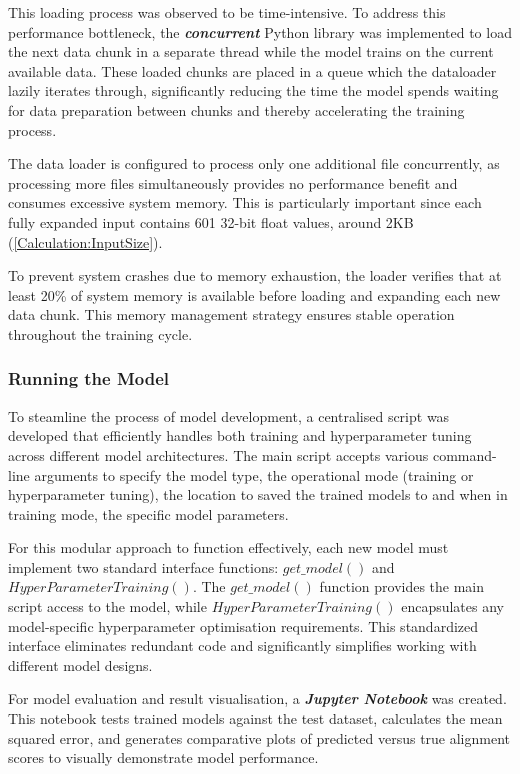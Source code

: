 This loading process was observed to be time-intensive. To address this performance bottleneck, the \textbf{\textit{concurrent}} Python library was implemented to load the next data chunk in a separate thread while the model trains on the current available data. These loaded chunks are placed in a queue which the dataloader lazily iterates through, significantly reducing the time the model spends waiting for data preparation between chunks and thereby accelerating the training process.

The data loader is configured to process only one additional file concurrently, as processing more files simultaneously provides no performance benefit and consumes excessive system memory. This is particularly important since each fully expanded input contains 601 32-bit float values, around 2KB (\ref{Calculation:InputSize}).

To prevent system crashes due to memory exhaustion, the loader verifies that at least 20\% of system memory is available before loading and expanding each new data chunk. This memory management strategy ensures stable operation throughout the training cycle.

\subsubsection{Running the Model}
To steamline the process of model development, a centralised script was developed that efficiently handles both training and hyperparameter tuning across different model architectures. The main script accepts various command-line arguments to specify the model type, the operational mode (training or hyperparameter tuning), the location to saved the trained models to and when in training mode, the specific model parameters.

For this modular approach to function effectively, each new model must implement two standard interface functions: $get\_model()$ and $HyperParameterTraining()$. The $get\_model()$ function provides the main script access to the model, while $HyperParameterTraining()$ encapsulates any model-specific hyperparameter optimisation requirements. This standardized interface eliminates redundant code and significantly simplifies working with different model designs.

For model evaluation and result visualisation, a \textbf{\textit{Jupyter Notebook}} was created. This notebook tests trained models against the test dataset, calculates the mean squared error, and generates comparative plots of predicted versus true alignment scores to visually demonstrate model performance.

